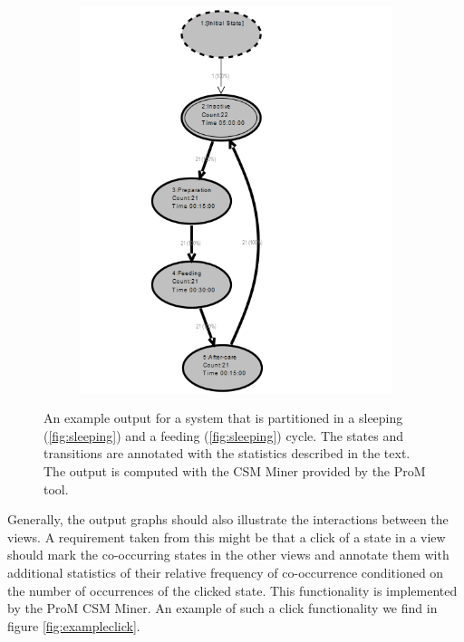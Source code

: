 \documentclass[12pt]{extarticle}
\begin{document}
\begin{figure}[H]
\begin{subfigure}[b]{0.45\textwidth}
        \includegraphics[width=\textwidth]{../Diagrams/feeding.png}
        \caption{}
        \label{fig:feeding}
    \end{subfigure}
    \caption{An example output for a system that is partitioned in a sleeping (\ref{fig:sleeping}) and a feeding (\ref{fig:sleeping}) cycle. The states and transitions are annotated with the statistics described in the text. The output is computed with the CSM Miner provided by the ProM tool.}
    \label{fig:exampleview}
\end{figure}

Generally, the output graphs should also illustrate the interactions between the views. A requirement taken from this might be that a click of a state in a view should mark the co-occurring states in the other views and annotate them with additional statistics of their relative frequency of co-occurrence conditioned on the number of occurrences of the clicked state. This functionality is implemented by the ProM CSM Miner. An example of such a click functionality we find in figure \ref{fig:exampleclick}.
\end{document}
